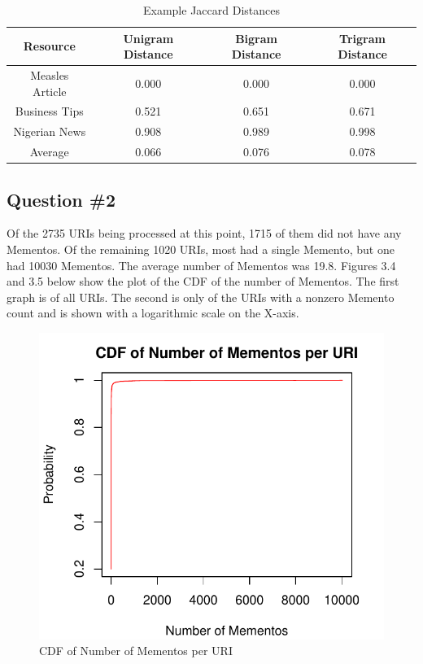 \documentclass[a4paper,12pt]{article}
\begin{document}
\begin{table}[H]
\centering
\caption{Example Jaccard Distances}
\begin{tabular}{ | c | c | c | c | }
\hline
\textbf{Resource}  & \textbf{Unigram Distance} & \textbf{Bigram Distance} & \textbf{Trigram Distance} \\ \hline
Measles Article & 0.000  & 0.000  & 0.000  \\ \hline
Business Tips   & 0.521  & 0.651  & 0.671  \\ \hline
Nigerian News   & 0.908  & 0.989  & 0.998  \\ \hline
Average         & 0.066  & 0.076  & 0.078  \\ \hline
\end{tabular}
\end{table}


\subsection{Question \#2}
Of the 2735 URIs being processed at this point, 1715 of them did not have any Mementos. Of the remaining
1020 URIs, most had a single Memento, but one had 10030 Mementos. The average number of Mementos was 19.8.
Figures 3.4 and 3.5 below show the plot of the CDF of the number of Mementos. The first graph is of all
URIs. The second is only of the URIs with a nonzero Memento count and is shown with a logarithmic scale
on the X-axis.

\begin{figure}[H]
    \centering
    \includegraphics{stats/memento_counts.pdf}
    \caption{CDF of Number of Mementos per URI}
\end{figure}
\end{document}
